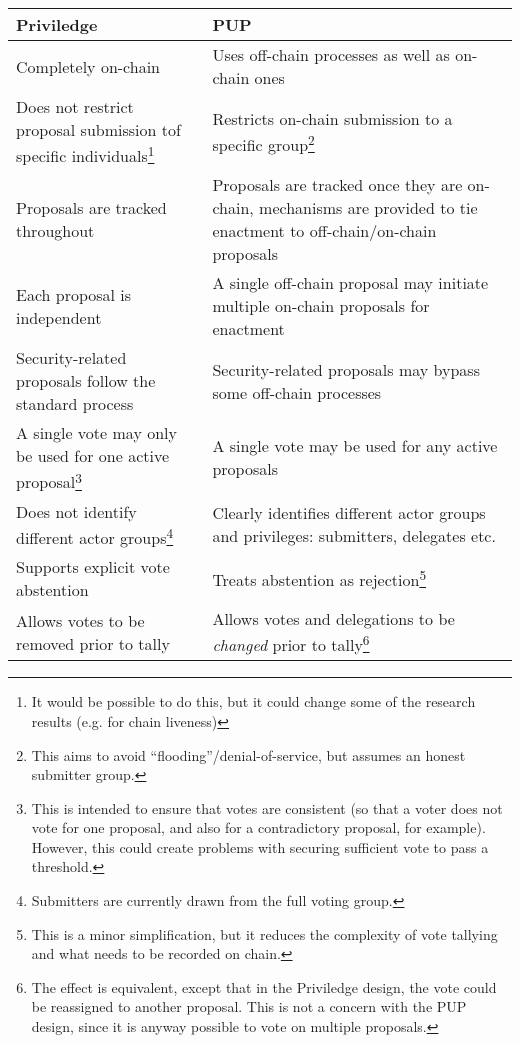 \begin{tabular}{||p{3in}|p{3in}||}
  \hline\hline
  \textbf{Priviledge} & \textbf{PUP}
  \\\hline
  Completely on-chain & Uses off-chain processes as well as on-chain ones \\\hline
  Does not restrict proposal submission tof specific individuals\footnote{It would be possible to do this, but it could change some of the research results (e.g. for chain liveness)} & Restricts on-chain submission to a specific group\footnote{This aims to avoid ``flooding''/denial-of-service, but assumes an honest submitter group.}\\\hline
  Proposals are tracked throughout & Proposals are tracked once they are on-chain, mechanisms are provided to tie enactment to off-chain/on-chain proposals \\\hline
  Each proposal is independent & A single off-chain proposal may initiate multiple on-chain proposals for enactment \\\hline
  Security-related proposals follow the standard process  & Security-related proposals may bypass some off-chain processes \\\hline
  A single vote may only be used for one active proposal\footnote{This is intended to ensure that votes are consistent (so that a voter does not vote for one proposal, and also for a contradictory proposal, for example).  However, this could create problems with
    securing sufficient vote to pass a threshold.}
    & A single vote may be used for any active proposals \\\hline
  Does not identify different actor groups\footnote{Submitters are currently drawn from the full voting group.} & Clearly identifies different actor groups and privileges: submitters, delegates etc. \\\hline
  Supports explicit vote abstention & Treats abstention as rejection\footnote{This is a minor simplification, but it reduces the complexity of vote tallying and what needs to be recorded on chain.} \\\hline
  Allows votes to be removed prior to tally & Allows votes and delegations to be \emph{changed} prior to tally\footnote{The effect is equivalent, except that in the Priviledge design, the vote could be reassigned to another proposal.  This is not a concern with the PUP design, since it is anyway possible to vote on multiple proposals.} \\\hline

\end{tabular}
